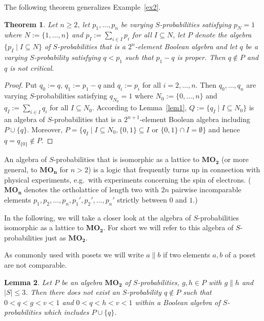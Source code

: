 \documentclass[12pt]{article}
\newtheorem{theorem}{Theorem}[section]
\newtheorem{lemma}[theorem]{Lemma}
\begin{document}
The following theorem generalizes Example~\ref{ex2}.

\begin{theorem}
Let $n\ge2$, let $p_1,\ldots,p_n$ be varying $S$-probabilities satisfying $p_N=1$ where $N:=\{1,\ldots,n\}$ and $p_I:=\sum\limits_{i\in I}p_i$ for all $I\subseteq N$, let $P$ denote the algebra $\{p_I\mid I\subseteq N\}$ of $S$-probabilities that is a $2^n$-element Boolean algebra and let $q$ be a varying $S$-probability satisfying $q<p_1$ such that $p_1-q$ is proper. Then $q\notin P$ and $q$ is not critical.
\end{theorem}

\begin{proof}
Put $q_0:=q$, $q_1:=p_1-q$ and $q_i:=p_i$ for all $i=2,\ldots,n$. Then $q_0,\ldots,q_n$ are varying $S$-probabilities satisfying $q_{N_0}=1$ where $N_0:=\{0,\ldots,n\}$ and $q_I:=\sum\limits_{i\in I}q_i$ for all $I\subseteq N_0$. According to Lemma~\ref{lem1}, $Q:=\{q_I\mid I\subseteq N_0\}$ is an algebra of $S$-probabilities that is a $2^{n+1}$-element Boolean algebra including $P\cup\{q\}$. Moreover, $P=\{q_I\mid I\subseteq N_0,\{0,1\}\subseteq I\mbox{ or }\{0,1\}\cap I=\emptyset\}$ and hence $q=q_{\{0\}}\notin P$.
\end{proof}

An algebra of $S$-probabilities that is isomorphic as a lattice to $\mathbf{MO_2}$ (or more general, to $\mathbf{MO_n}$ for $n>2$) is a logic that frequently turns up in connection with physical experiments, e.g.\ with experiments concerning the spin of electrons. ($\mathbf{MO_n}$ denotes the ortholattice of length two with $2n$ pairwise incomparable elements $p_1,p_2,\ldots,p_n,p_1',p_2',\ldots,p_n'$ strictly between $0$ and $1$.)

In the following, we will take a closer look at the algebra of $S$-probabilities isomorphic as a lattice to $\mathbf{MO_2}$. For short we will refer to this algebra of $S$-probabilities just as $\mathbf{MO_2}$.

As commonly used with posets we will write $a\parallel b$ if two elements $a,b$ of a poset  are not comparable.

\begin{lemma}\label{lm2}
Let $P$ be an algebra $\mathbf{MO_2}$ of $S$-probabilities, $g,h\in P$ with $g\parallel h$ and $|S|\le3$. Then there does not exist an $S$-probability $q\notin P$ such that $0<q<g<v<1$ and $0<q<h<v<1$ within a Boolean algebra of $S$-probabilities which includes $P\cup\{q\}$.
\end{lemma}
\end{document}

